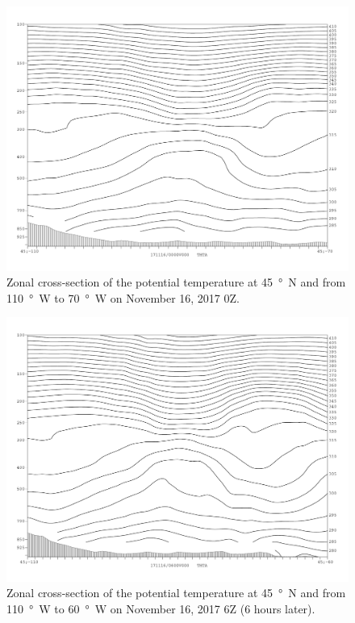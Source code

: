 \documentclass[11pt]{article}
\begin{document}
\begin{figure}[h!]
  \centering
  \includegraphics[width=\textwidth]{thta_171116_0Z_EW}
  \caption{Zonal cross-section of the potential temperature at \SI{45}{\degree N} and from \SI{110}{\degree W} to \SI{70}{\degree W} on November 16, 2017 0Z.}
  \label{fig:thta_171116_0Z_EW}
\end{figure}

\begin{figure}[h!]
  \centering
  \includegraphics[width=\textwidth]{thta_171116_6Z_moreEast}
  \caption{Zonal cross-section of the potential temperature at \SI{45}{\degree N} and from \SI{110}{\degree W} to \SI{60}{\degree W} on November 16, 2017 6Z (6 hours later).}
  \label{fig:thta_171116_6Z_EW}
\end{figure}
\end{document}
